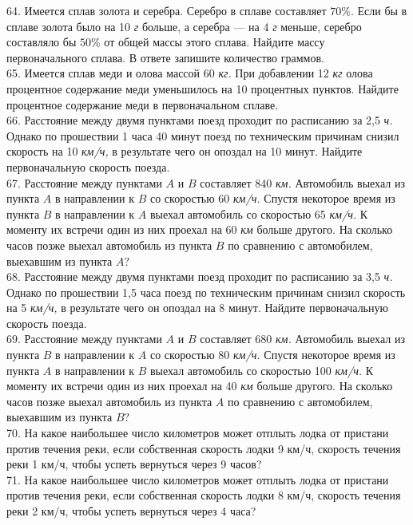 \documentclass[12pt]{article}
\begin{document}
64. Имеется сплав золота и серебра. Серебро в сплаве составляет $70\%.$ Если бы в сплаве золота было на 10 {\it г} больше, а серебра --- на 4 {\it г} меньше, серебро составляло бы $50\%$ от общей массы этого сплава. Найдите массу первоначального сплава. В ответе запишите количество граммов.\\
65. Имеется сплав меди и олова массой 60 {\it кг.} При добавлении 12 {\it кг} олова процентное содержание меди уменьшилось на 10 процентных пунктов. Найдите процентное содержание меди в первоначальном сплаве.\\
66. Расстояние между двумя пунктами поезд проходит по расписанию за 2,5 {\it ч.} Однако по прошествии 1 часа 40 минут поезд по техническим причинам снизил скорость на 10 {\it км/ч,} в результате чего он опоздал на 10 минут. Найдите первоначальную скорость поезда.\\
67. Расстояние между пунктами $A$ и $B$ составляет 840 {\it км.} Автомобиль выехал из пункта $A$ в направлении к $B$ со скоростью 60 {\it км/ч.} Спустя некоторое время из пункта $B$ в направлении к $A$ выехал автомобиль со скоростью 65 {\it км/ч.} К моменту их встречи один из них проехал на 60 {\it км} больше другого. На сколько часов позже выехал автомобиль из пункта $B$ по сравнению с автомобилем, выехавшим из пункта $A?$\\
68. Расстояние между двумя пунктами поезд проходит по расписанию за 3,5 {\it ч.} Однако по прошествии 1,5 часа поезд по техническим причинам снизил скорость на 5 {\it км/ч,} в результате чего он опоздал на 8 минут. Найдите первоначальную скорость поезда.\\
69. Расстояние между пунктами $A$ и $B$ составляет 680 {\it км.} Автомобиль выехал из пункта $B$ в направлении к $A$ со скоростью 80 {\it км/ч.} Спустя некоторое время из пункта $A$ в направлении к $B$ выехал автомобиль со скоростью 100 {\it км/ч.} К моменту их встречи один из них проехал на 40 {\it км} больше другого. На сколько часов позже выехал автомобиль из пункта $A$ по сравнению с автомобилем, выехавшим из пункта $B?$\\
70. На какое наибольшее число километров может отплыть лодка от пристани против течения реки, если собственная скорость лодки 9 км/ч, скорость течения реки 1 км/ч, чтобы успеть вернуться через 9 часов?\\
71. На какое наибольшее число километров может отплыть лодка от пристани против течения реки, если собственная скорость лодки 8 км/ч, скорость течения реки 2 км/ч, чтобы успеть вернуться через 4 часа?\\
\end{document}
